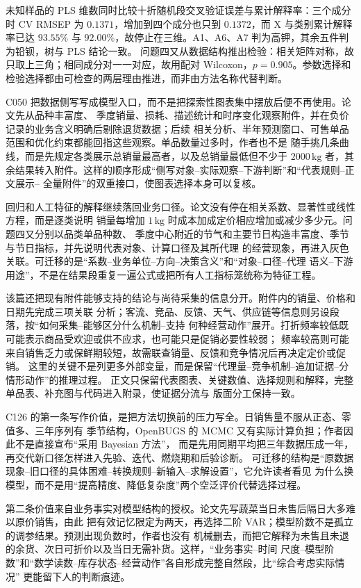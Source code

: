 未知样品的 PLS 维数同时比较十折随机段交叉验证误差与累计解释率：三个成分时 CV RMSEP 为
$0.1371$，增加到四个成分也只到 $0.1372$，而 X 与类别累计解释率已达 $93.55\%$ 与
$92.00\%$，故停止在三维。A1、A6、A7 判为高钾，其余五件判为铅钡，树与 PLS 结论一致。
问题四又从数据结构推出检验：相关矩阵对称，故只取上三角；相同成分对一一对应，故用配对
Wilcoxon，$p=0.905$。参数选择和检验选择都由可检查的两层理由推进，而非由方法名称代替判断。

C050 把数据侧写写成模型入口，而不是把探索性图表集中摆放后便不再使用。论文先从品种丰富度、
季度销量、损耗、描述统计和时序变化观察附件，并在负价记录的业务含义明确后剔除退货数据；后续
相关分析、半年预测窗口、可售单品范围和优化约束都能回指这些观察。单品数量过多时，作者也不是
随手挑几条曲线，而是先规定各类展示总销量最高者，以及总销量最低但不少于 $2000\,\mathrm{kg}$
者，其余结果转入附件。这样的顺序形成“侧写对象--实际观察--下游判断”和“代表规则--正文展示--
全量附件”的双重接口，使图表选择本身可以复核。

回归和人工特征的解释继续落回业务口径。论文没有停在相关系数、显著性或线性方程，而是逐类说明
销量每增加 $1\,\mathrm{kg}$ 时成本加成定价相应增加或减少多少元。问题四又分别以品类单品种数、
季度中心附近的节气和主要节日构造丰富度、季节与节日指标，并先说明代表对象、计算口径及其所代理
的经营现象，再进入灰色关联。可迁移的是“系数--业务单位--方向--决策含义”和“对象--口径--代理
语义--下游用途”，不是在结果段重复一遍公式或把所有人工指标笼统称为特征工程。

该篇还把现有附件能够支持的结论与尚待采集的信息分开。附件内的销量、价格和日期先完成三项关联
分析；客流、竞品、反馈、天气、供应链等信息则另设段落，按“如何采集--能够区分什么机制--支持
何种经营动作”展开。打折频率较低既可能表示商品受欢迎或供不应求，也可能只是促销必要性较弱；
频率较高则可能来自销售乏力或保鲜期较短，故需联查销量、反馈和竞争情况后再决定定价或促销。
这里的关键不是列更多外部变量，而是保留“代理量--竞争机制--追加证据--分情形动作”的推理过程。
正文只保留代表图表、关键数值、选择规则和解释，完整单品表、补充图与代码进入附录，使证据分流与
版面分工保持一致。

C126 的第一条写作价值，是把方法切换前的压力写全。日销售量不服从正态、零值多、三年序列有
季节结构，OpenBUGS 的 MCMC 又有实际计算负担；作者因此不是直接宣布“采用 Bayesian 方法”，
而是先用同期平均把三年数据压成一年，再交代新口径怎样进入先验、迭代、燃烧期和后验诊断。
可迁移的结构是“原数据现象--旧口径的具体困难--转换规则--新输入--求解设置”，它允许读者看见
为什么换模型，而不是用“提高精度、降低复杂度”两个空泛评价代替选择过程。

第二条价值来自业务事实对模型结构的授权。论文先写蔬菜当日未售后隔日大多难以原价销售，由此
把有效记忆限定为两天，再选择二阶 VAR；模型阶数不是孤立的调参结果。预测出现负数时，作者也没有
机械删去，而把它解释为未售且未退的余货、次日可折价以及当日无需补货。这样，“业务事实--时间
尺度--模型阶数”和“数学读数--库存状态--经营动作”各自形成完整自然段，比“综合考虑实际情况”
更能留下人的判断痕迹。

